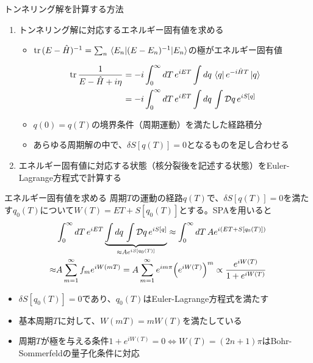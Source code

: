 \documentclass[14pt,aspectratio=169,xcolor=dvipsnames,table,dvipdfmx]{beamer}
\theoremstyle{definition}
\begin{document}
\begin{frame}{トンネリング解を計算する方法}
  \begin{enumerate}
    \item トンネリング解に対応するエネルギー固有値を求める
          \begin{itemize}
            \item $\trace{(E-\hat{H})^{-1}}=\sum_{n}\ev{(E-E_n)^{-1}}{E_n}$の極がエネルギー固有値
          \end{itemize}
          \begin{align*}
            \trace\frac{1}{E-\hat{H}+i\eta} & =-i\int_0^{\infty}dT\,e^{iET}\int dq\,\bra{q}e^{-i\hat{H}T}\ket{q} \\
                                            & = -i\int_0^{\infty}dT\,e^{iET}\int dq\,\int\mathcal{D}q\,e^{iS[q]}
          \end{align*}
          \begin{itemize}
            \item $q(0)=q(T)$の境界条件（周期運動）を満たした経路積分
            \item あらゆる周期解の中で、$\delta S[q(T)]=0$となるものを足し合わせる
          \end{itemize}
  \end{enumerate}
  \begin{enumerate}
    \setcounter{enumi}{1}
    \item エネルギー固有値に対応する状態（核分裂後を記述する状態）をEuler-Lagrange方程式で計算する
  \end{enumerate}
\end{frame}

\begin{frame}{エネルギー固有値を求める}
  周期$T$の運動の経路$q(T)$で、$\delta S[q(T)]=0$を満たす$q_0(T)$について$W(T)=ET+S[q_0(T)]$とする。SPAを用いると
  \begin{align*}
            & \int_0^{\infty}dT\,e^{iET}\underbrace{\int dq\,\int\mathcal{D}q\,e^{iS[q]}}_{\approx Ae^{iS[q_0(T)]}}
    \approx\int_0^{\infty}dT\,Ae^{i\qty(ET + S[q_0(T)])}                                                                               \\
    \approx & A\sum_{m=1}^{\infty}f_m e^{iW(mT)} =A\sum_{m=1}^{\infty}e^{im\pi}\qty(e^{iW(T)})^m \propto \frac{e^{iW(T)}}{1+e^{iW(T)}}
  \end{align*}
  \begin{itemize}
    \item $\delta S[q_0(T)]=0$であり、$q_0(T)$はEuler-Lagrange方程式を満たす
    \item 基本周期$T$に対して、$W(mT)=mW(T)$を満たしている
    \item 周期$T$が極を与える条件$1+e^{iW(T)}=0\Leftrightarrow W(T)=(2n+1)\pi$はBohr-Sommerfeldの量子化条件に対応
  \end{itemize}
\end{frame}
\end{document}
